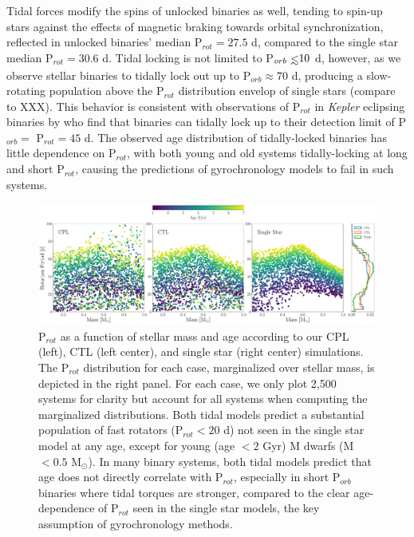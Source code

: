 \documentclass[twocolumn]{aastex61}
\def\lsim{~\rlap{$<$}{\lower 1.0ex\hbox{$\sim$}}}
\newcommand{\kepler}[0]{\textit{Kepler}\xspace}
\begin{document}
Tidal forces modify the spins of unlocked binaries as well, tending to spin-up stars against the effects of magnetic braking towards orbital synchronization, reflected in unlocked binaries' median P$_{rot} = 27.5$ d, compared to the single star median P$_{rot} = 30.6$ d. Tidal locking is not limited to P$_{orb} \lsim 10$ d, however, as we observe stellar binaries to tidally lock out up to P$_{orb} \approx 70$ d, producing a slow-rotating population above the P$_{rot}$ distribution envelop of single stars (compare to XXX). This behavior is consistent with observations of P$_{rot}$ in \kepler eclipsing binaries by \citet{Lurie2017} who find that binaries can tidally lock up to their detection limit of P$_{orb} = $ P$_{rot} = 45$ d. The observed age distribution of tidally-locked binaries has little dependence on P$_{rot}$, with both young and old systems tidally-locking at long and short P$_{rot}$, causing the predictions of gyrochronology models to fail in such systems. 

\begin{figure}[t]
	\includegraphics[width=\textwidth]{../Plots/protDist.pdf}
   \caption{P$_{rot}$ as a function of stellar mass and age according to our CPL (left), CTL (left center), and single star (right center) simulations. The P$_{rot}$ distribution for each case, marginalized over stellar mass, is depicted in the right panel. For each case, we only plot 2,500 systems for clarity but account for all systems when computing the marginalized distributions. Both tidal models predict a substantial population of fast rotators (P$_{rot} < 20$ d) not seen in the single star model at any age, except for young (age $< 2$ Gyr) M dwarfs (M$ < 0.5$ M$_{\odot}$). In many binary systems, both tidal models predict that age does not directly correlate with P$_{rot}$, especially in short P$_{orb}$ binaries where tidal torques are stronger, compared to the clear age-dependence of P$_{rot}$ seen in the single star models, the key assumption of gyrochronology methods.}%
    \label{fig:protDist}%
\end{figure}
\end{document}
